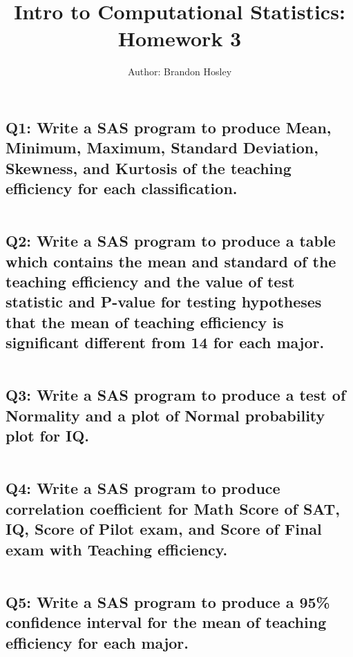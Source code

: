 \documentclass[a4paper,man,natbib]{apa6}
\title{Intro to Computational Statistics: Homework 3}
\author{Author: Brandon Hosley}
\affiliation{Instructor: Liang Kong, Ph.D}
\begin{document}
\maketitle
\singlespacing
	
\subsection*{Q1: Write a SAS program to produce Mean, Minimum, Maximum, Standard Deviation, Skewness, and Kurtosis of the teaching efficiency for each classification. }
\inputminted[breaklines,bgcolor=light-gray]{sas}{./Snippets/DAT502-HW3-1.sas}


\subsection*{Q2: Write a SAS program to produce a table which contains the mean and standard of the teaching efficiency and the value of test statistic and P-value for testing hypotheses that the mean of teaching efficiency is significant different from 14 for each major. }
\inputminted[breaklines,bgcolor=light-gray]{sas}{./Snippets/DAT502-HW3-2.sas}


\subsection*{Q3: Write a SAS program to produce a test of Normality and a plot of Normal probability plot for IQ. }
\inputminted[breaklines,bgcolor=light-gray]{sas}{./Snippets/DAT502-HW3-3.sas}


\subsection*{Q4: Write a SAS program to produce correlation coefficient for Math Score of SAT, IQ, Score of Pilot exam, and Score of Final exam with Teaching efficiency. }
\inputminted[breaklines,bgcolor=light-gray]{sas}{./Snippets/DAT502-HW3-4.sas}


\subsection*{Q5: Write a SAS program to produce  a 95\% confidence interval for the mean of teaching efficiency for each major. }
\inputminted[breaklines,bgcolor=light-gray]{sas}{./Snippets/DAT502-HW3-5.sas}

\end{document}
